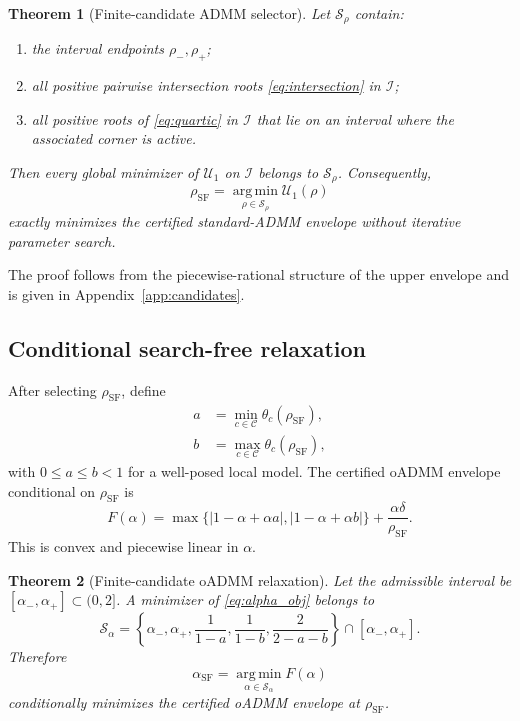 \documentclass[11pt]{article}
\newtheorem{theorem}{Theorem}[section]
\theoremstyle{definition}
\newcommand{\argmin}{\operatorname*{arg\,min}}
\begin{document}
\begin{theorem}[Finite-candidate ADMM selector]\label{thm:finite_candidate}
Let $\mathcal S_\rho$ contain:
\begin{enumerate}[leftmargin=2em]
\item the interval endpoints $\rho_-,\rho_+$;
\item all positive pairwise intersection roots \eqref{eq:intersection} in $\mathcal I$;
\item all positive roots of \eqref{eq:quartic} in $\mathcal I$ that lie on an interval where the associated corner is active.
\end{enumerate}
Then every global minimizer of $\mathcal U_1$ on $\mathcal I$ belongs to $\mathcal S_\rho$. Consequently,
\begin{equation}
\rho_{\mathrm{SF}}
=\argmin_{\rho\in\mathcal S_\rho}\mathcal U_1(\rho)
\label{eq:rho_sf}
\end{equation}
exactly minimizes the certified standard-ADMM envelope without iterative parameter search.
\end{theorem}

The proof follows from the piecewise-rational structure of the upper envelope and is given in Appendix~\ref{app:candidates}.

\subsection{Conditional search-free relaxation}
After selecting $\rho_{\mathrm{SF}}$, define
\begin{align}
a&=\min_{c\in\mathcal C}\theta_c(\rho_{\mathrm{SF}}),\\
b&=\max_{c\in\mathcal C}\theta_c(\rho_{\mathrm{SF}}),
\end{align}
with $0\le a\le b<1$ for a well-posed local model. The certified oADMM envelope conditional on $\rho_{\mathrm{SF}}$ is
\begin{equation}
F(\alpha)
=\max\{|1-\alpha+\alpha a|,|1-\alpha+\alpha b|\}
+\frac{\alpha\delta}{\rho_{\mathrm{SF}}}.
\label{eq:alpha_obj}
\end{equation}
This is convex and piecewise linear in $\alpha$.

\begin{theorem}[Finite-candidate oADMM relaxation]\label{thm:alpha_candidates}
Let the admissible interval be $[\alpha_-,\alpha_+]\subset(0,2]$. A minimizer of \eqref{eq:alpha_obj} belongs to
\begin{equation}
\mathcal S_\alpha=
\left\{
\alpha_-,\alpha_+,
\frac{1}{1-a},
\frac{1}{1-b},
\frac{2}{2-a-b}
\right\}
\cap[\alpha_-,\alpha_+].
\label{eq:alpha_set}
\end{equation}
Therefore
\begin{equation}
\alpha_{\mathrm{SF}}
=\argmin_{\alpha\in\mathcal S_\alpha}F(\alpha)
\label{eq:alpha_sf}
\end{equation}
conditionally minimizes the certified oADMM envelope at $\rho_{\mathrm{SF}}$.
\end{theorem}
\end{document}
